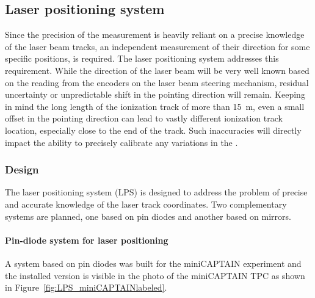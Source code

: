 
\subsection{Laser positioning system}
\label{sec:calib-laser-pos}

Since the precision of the \efield measurement is heavily reliant on a precise knowledge of the laser beam tracks, an independent measurement of their direction for some specific positions, is required. The laser positioning system addresses this requirement.
While the direction of the laser beam will be very well known based on the reading from the encoders on the laser beam steering mechanism,  residual uncertainty or unpredictable shift in the pointing direction will remain. 
Keeping in mind the long length of the ionization track of more than \SI{15}{\m}, even a small offset in the pointing direction can lead to vastly different ionization track location, especially close to the end of the track. Such inaccuracies will directly impact the ability to precisely calibrate any variations in the \efield.

\subsubsection{Design}

The laser positioning system (LPS) is designed to address the problem of precise and accurate knowledge of the laser track coordinates. %
Two complementary systems are planned, one based on pin diodes and another based on mirrors.

\paragraph{Pin-diode system for laser positioning}

A system based on pin diodes 
was built for the miniCAPTAIN experiment and the installed version is visible in the photo of the miniCAPTAIN TPC as shown in  Figure~\ref{fig:LPS_miniCAPTAINlabeled}.  


